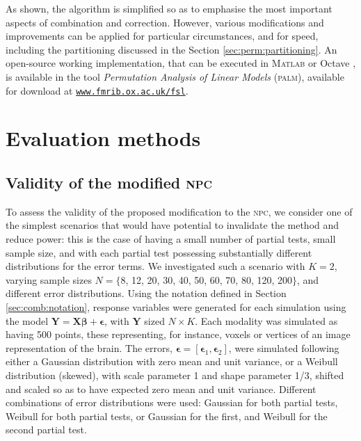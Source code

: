 As shown, the algorithm is simplified so as to emphasise the most important aspects of combination and correction. However, various modifications and improvements can be applied for particular circumstances, and for speed, including the partitioning discussed in the Section \ref{sec:perm:partitioning}. An open-source working implementation, that can be executed in \textsc{Matlab} \citep{MATLAB2015} or Octave \citep{Eaton2015}, is available in the tool \emph{Permutation Analysis of Linear Models} (\textsc{palm}), available for download at \href{http://www.fmrib.ox.ac.uk/fsl}{\texttt{www.fmrib.ox.ac.uk/fsl}}.

\section{Evaluation methods}

\subsection{Validity of the modified \textsc{npc}}

To assess the validity of the proposed modification to the \textsc{npc}, we consider one of the simplest scenarios that would have potential to invalidate the method and reduce power: this is the case of having a small number of partial tests, small sample size, and with each partial test possessing substantially different distributions for the error terms. We investigated such a scenario with $K=2$, varying sample sizes $N = \{$8, 12, 20, 30, 40, 50, 60, 70, 80, 120, 200$\}$, and different error distributions. Using the notation defined in Section \ref{sec:comb:notation}, response variables were generated for each simulation using the model $\mathbf{Y} = \mathbf{X}\boldsymbol{\beta} + \boldsymbol{\epsilon}$, with $\mathbf{Y}$ sized $N \times K$. Each modality was simulated as having 500 points, these representing, for instance, voxels or vertices of an image representation of the brain. The errors, $\boldsymbol{\epsilon} = \left[\boldsymbol{\epsilon}_1 , \boldsymbol{\epsilon}_2\right]$, were simulated following either a Gaussian distribution with zero mean and unit variance, or a Weibull distribution (skewed), with scale parameter 1 and shape parameter 1/3, shifted and scaled so as to have expected zero mean and unit variance. Different combinations of error distributions were used: Gaussian for both partial tests, Weibull for both partial tests, or Gaussian for the first, and Weibull for the second partial test.

